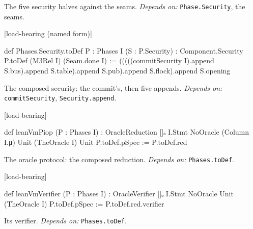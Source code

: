 
The five security halves against the seams. \emph{Depends on:} \texttt{Phase.\allowbreak{}Security}, the seams.

\par\medskip\noindent\textbf{}\hfill\textsf{\small [load-bearing (named form)]}\par\nopagebreak

\begin{leancode}
def Phases.Security.toDef {P : Phases I} (S : P.Security) :
    Component.Security P.toDef (M3Rel I) (Seam.done I) :=
  (((((commitSecurity I).append S.bus).append S.table).append S.pub).append S.flock).append
    S.opening
\end{leancode}


The composed security: the commit's, then five appends. \emph{Depends on:} \texttt{commitSecurity}, \texttt{Security.\allowbreak{}append}.

\par\medskip\noindent\textbf{}\hfill\textsf{\small [load-bearing]}\par\nopagebreak

\begin{leancode}
def leanVmPiop (P : Phases I) :
    OracleReduction []ₒ I.Stmt NoOracle (Column I.μ) Unit (TheOracle I) Unit P.toDef.pSpec :=
  P.toDef.red
\end{leancode}


The oracle protocol: the composed reduction. \emph{Depends on:} \texttt{Phases.\allowbreak{}toDef}.

\par\medskip\noindent\textbf{}\hfill\textsf{\small [load-bearing]}\par\nopagebreak

\begin{leancode}
def leanVmVerifier (P : Phases I) :
    OracleVerifier []ₒ I.Stmt NoOracle Unit (TheOracle I) P.toDef.pSpec :=
  P.toDef.red.verifier
\end{leancode}


Its verifier. \emph{Depends on:} \texttt{Phases.\allowbreak{}toDef}.

